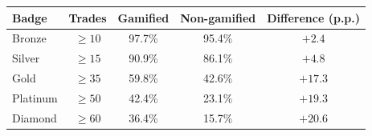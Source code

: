 \begin{tabular}{@{}lcccc@{}}
\toprule
Badge & Trades & Gamified & Non-gamified & Difference (p.p.) \\
\midrule
Bronze   & $\ge 10$ & 97.7\% & 95.4\% & $+2.4$ \\
Silver   & $\ge 15$ & 90.9\% & 86.1\% & $+4.8$ \\
Gold     & $\ge 35$ & 59.8\% & 42.6\% & $+17.3$ \\
Platinum & $\ge 50$ & 42.4\% & 23.1\% & $+19.3$ \\
Diamond  & $\ge 60$ & 36.4\% & 15.7\% & $+20.6$ \\
\bottomrule
\end{tabular}
